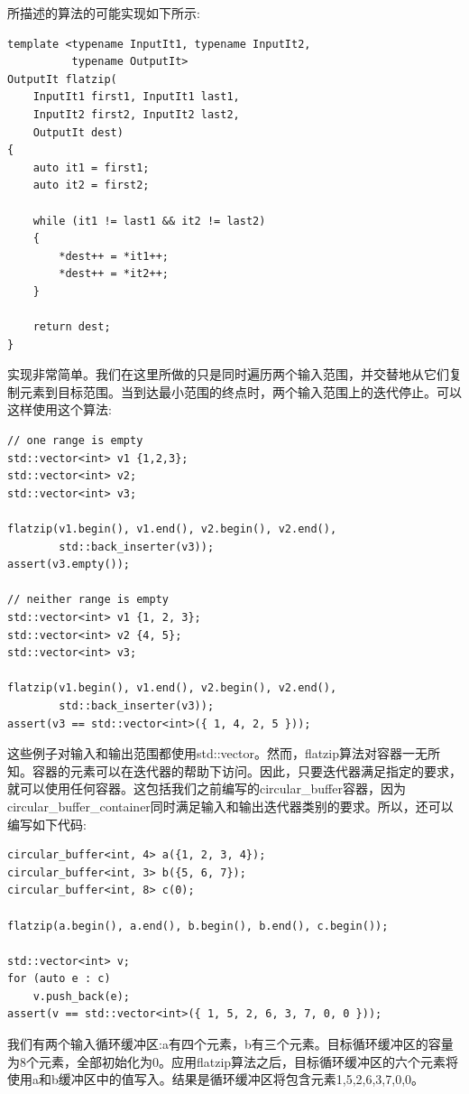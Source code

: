 所描述的算法的可能实现如下所示:

\begin{lstlisting}[style=styleCXX]
template <typename InputIt1, typename InputIt2,
		  typename OutputIt>
OutputIt flatzip(
	InputIt1 first1, InputIt1 last1,
	InputIt2 first2, InputIt2 last2,
	OutputIt dest)
{
	auto it1 = first1;
	auto it2 = first2;
	
	while (it1 != last1 && it2 != last2)
	{
		*dest++ = *it1++;
		*dest++ = *it2++;
	}

	return dest;
}
\end{lstlisting}

实现非常简单。我们在这里所做的只是同时遍历两个输入范围，并交替地从它们复制元素到目标范围。当到达最小范围的终点时，两个输入范围上的迭代停止。可以这样使用这个算法:

\begin{lstlisting}[style=styleCXX]
// one range is empty
std::vector<int> v1 {1,2,3};
std::vector<int> v2;
std::vector<int> v3;

flatzip(v1.begin(), v1.end(), v2.begin(), v2.end(),
		std::back_inserter(v3));
assert(v3.empty());

// neither range is empty
std::vector<int> v1 {1, 2, 3};
std::vector<int> v2 {4, 5};
std::vector<int> v3;

flatzip(v1.begin(), v1.end(), v2.begin(), v2.end(),
		std::back_inserter(v3));
assert(v3 == std::vector<int>({ 1, 4, 2, 5 }));
\end{lstlisting}

这些例子对输入和输出范围都使用std::vector。然而，flatzip算法对容器一无所知。容器的元素可以在迭代器的帮助下访问。因此，只要迭代器满足指定的要求，就可以使用任何容器。这包括我们之前编写的circular\_buffer容器，因为circular\_buffer\_container同时满足输入和输出迭代器类别的要求。所以，还可以编写如下代码:

\begin{lstlisting}[style=styleCXX]
circular_buffer<int, 4> a({1, 2, 3, 4});
circular_buffer<int, 3> b({5, 6, 7});
circular_buffer<int, 8> c(0);

flatzip(a.begin(), a.end(), b.begin(), b.end(), c.begin());

std::vector<int> v;
for (auto e : c)
	v.push_back(e);
assert(v == std::vector<int>({ 1, 5, 2, 6, 3, 7, 0, 0 }));
\end{lstlisting}

我们有两个输入循环缓冲区:a有四个元素，b有三个元素。目标循环缓冲区的容量为8个元素，全部初始化为0。应用flatzip算法之后，目标循环缓冲区的六个元素将使用a和b缓冲区中的值写入。结果是循环缓冲区将包含元素1,5,2,6,3,7,0,0。













